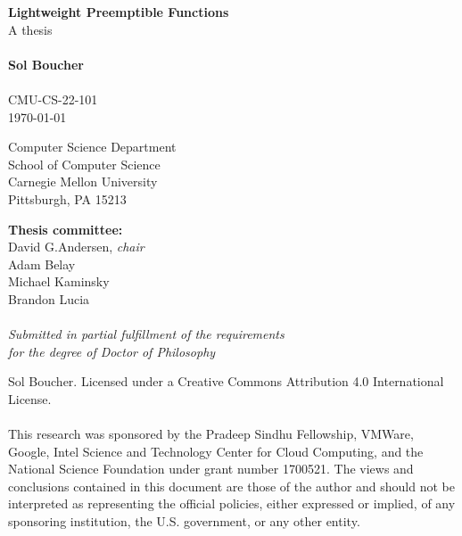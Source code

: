 \documentclass[12pt,letterpaper]{book}
\makeatletter
\let\label@\label
\makeatother
\begin{document}
\makeatletter
\let\label@\label
\let\ref@\ref
\newenvironment{namespacereferences}[1]{
	\renewcommand{\label}[1]{\label@{#1##1}}
	\renewcommand{\ref}[1]{\ref@{#1##1}}
}{
	\let\label\label@
	\let\ref\ref@
}
\makeatother

\frontmatter

\begin{titlepage}
\begin{center}
	\vspace*{\fill}

	\textbf{\Large Lightweight Preemptible Functions} \\
	A thesis \\
	\hfill \\
	\textbf{\large Sol Boucher} \\
	\hfill \\
	CMU-CS-22-101 \\
	\today \\

	\vspace{\fill}

	Computer Science Department \\
	School of Computer Science \\
	Carnegie Mellon University \\
	Pittsburgh, PA 15213 \\

	\vspace{\fill}

	\textbf{Thesis committee:} \\
	David G.\@ Andersen, \textit{chair} \\
	Adam Belay \\
	Michael Kaminsky \\
	Brandon Lucia \\
	\hfill \\
	\textit{Submitted in partial fulfillment of the requirements \\
	for the degree of Doctor of Philosophy} \\

	\vspace{\fill}

	\textcopyright \the\year{} Sol Boucher.
	Licensed under a Creative Commons Attribution 4.0 International License. \\
	\hfill \\
	This research was sponsored by the Pradeep Sindhu Fellowship, VMWare, Google,
	Intel Science and Technology Center for Cloud Computing, and the National
	Science Foundation under grant number 1700521.  The views and conclusions
	contained in this document are those of the author and should not be
	interpreted as representing the official policies, either expressed or
	implied, of any sponsoring institution, the U.S. government, or any other
	entity.
\end{center}
\end{titlepage}
\end{document}
